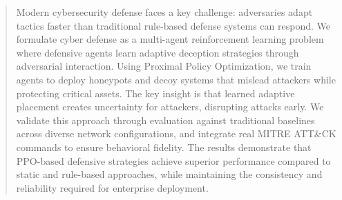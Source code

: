 \documentclass[12pt,oneside]{article}
\begin{document}



\tableofcontents
\clearpage  %

\begin{abstract}

\vspace{1em} %

Modern cybersecurity defense faces a key challenge: adversaries adapt tactics faster than traditional rule-based defense systems can respond. We formulate cyber defense as a multi-agent reinforcement learning problem where defensive agents learn adaptive deception strategies through adversarial interaction. Using Proximal Policy Optimization, we train agents to deploy honeypots and decoy systems that mislead attackers while protecting critical assets. The key insight is that learned adaptive placement creates uncertainty for attackers, disrupting attacks early. We validate this approach through evaluation against traditional baselines across diverse network configurations, and integrate real MITRE ATT\&CK commands to ensure behavioral fidelity. The results demonstrate that PPO-based defensive strategies achieve superior performance compared to static and rule-based approaches, while maintaining the consistency and reliability required for enterprise deployment.
\end{abstract}

\clearpage

\end{document}
